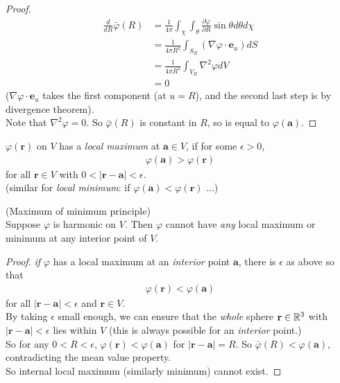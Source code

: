 \documentclass[a4paper]{article}
\begin{document}
\begin{thm}
\begin{proof}
\begin{equation*}
\begin{aligned}
\frac{d}{dR} \bar{\varphi}\left(R\right) &= \frac{1}{4\pi} \int_\chi \int_\theta \frac{\partial \varphi}{\partial R}\sin\theta d\theta d\chi\\
&= \frac{1}{4\pi R^2} \int_{S_R} \left(\nabla\varphi \cdot \mathbf{e}_u \right) dS\\
&= \frac{1}{4\pi R^2} \int_{V_R} \nabla^2 \varphi dV\\
&=0
\end{aligned}
\end{equation*}
($\nabla\varphi \cdot \mathbf{e}_u$ takes the first component (at $u=R$), and the second last step is by divergence theorem).\\
Note that $\nabla^2 \varphi = 0$. So $\bar{\varphi}\left(R\right)$ is constant in $R$, so is equal to $\varphi\left(\mathbf{a}\right)$.
\end{proof}
\end{thm}

\begin{defi}
$\varphi\left(\mathbf{r}\right)$ on $V$ has a \emph{local maximum} at $\mathbf{a}\in V$, if for some $\epsilon >0$,
\begin{equation*}
\begin{aligned}
\varphi\left(\mathbf{a}\right) > \varphi\left(\mathbf{r}\right)
\end{aligned}
\end{equation*}
for all $\mathbf{r}\in V$ with $0<|\mathbf{r}-\mathbf{a}|<\epsilon$.\\
(similar for \emph{local minimum}: if $\varphi\left(\mathbf{a}\right)<\varphi\left(\mathbf{r}\right)$ ...)
\end{defi}

\begin{coro}(Maximum of minimum principle)\\
Suppose $\varphi$ is harmonic on $V$. Then $\varphi$ cannot have \emph{any} local maximum or minimum at any interior point of $V$.
\begin{proof}
\emph{if} $\varphi$ has a local maximum at an \emph{interior} point $\mathbf{a}$, there is $\epsilon$ as above so that
\begin{equation*}
\begin{aligned}
\varphi\left(\mathbf{r}\right)<\varphi\left(\mathbf{a}\right)
\end{aligned}
\end{equation*}
for all $|\mathbf{r}-\mathbf{a}|<\epsilon$ and $\mathbf{r}\in V$.\\
By taking $\epsilon$ small enough, we can ensure that the \emph{whole} sphere $\mathbf{r}\in \mathbb{R}^3$ with $|\mathbf{r}-\mathbf{a}|<\epsilon$ lies within $V$ (this is always possible for an \emph{interior} point.)\\
So for any $0<R<\epsilon$, $\varphi\left(\mathbf{r}\right) < \varphi\left(\mathbf{a}\right)$ for $|\mathbf{r}-\mathbf{a}| = R$. So $\bar{\varphi}\left(R\right) < \varphi\left(\mathbf{a}\right)$, contradicting the mean value property.\\
So internal local maximum (similarly minimum) cannot exist.
\end{proof}
\end{coro}
\end{document}
